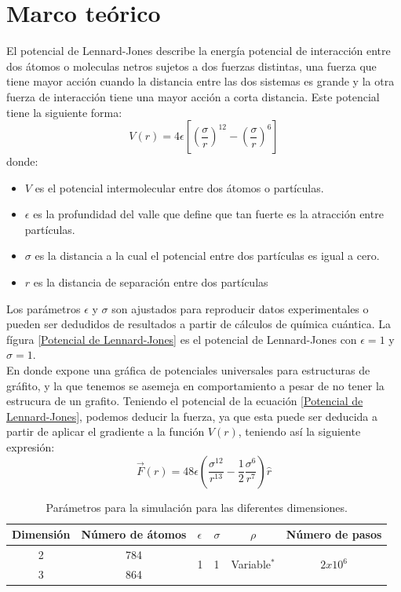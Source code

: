 \documentclass[reprint,amsmath,amssymb,aps,]{revtex4-2}
\begin{document}
\section{Marco teórico}
El potencial de Lennard-Jones describe la energía potencial de interacción entre dos átomos o moleculas netros sujetos a dos fuerzas distintas, una fuerza que tiene mayor acción cuando la distancia entre las dos sistemas es grande y la otra fuerza de interacción tiene una mayor acción a corta distancia. Este potencial tiene la siguiente forma:
\begin{equation}
    \label{Potencial de Lennard-Jones}
    V(r) = 4 \epsilon \left[\left(\frac{\sigma}{r} \right)^{12} - \left(\frac{\sigma}{r} \right)^6 \right]
\end{equation}
donde:
\begin{itemize}
    \item $V$ es el potencial intermolecular entre dos átomos o partículas.
    \item $\epsilon$ es la profundidad del valle que define que tan fuerte es la atracción entre partículas.
    \item $\sigma$ es la distancia a la cual el potencial entre dos partículas es igual a cero.
    \item $r$ es la distancia de separación entre dos partículas
\end{itemize}
Los parámetros $\epsilon$ y $\sigma$ son ajustados para reproducir datos experimentales o pueden ser dedudidos de resultados a partir de cálculos de química cuántica. La fígura \ref{Potencial de Lennard-Jones} es el potencial de Lennard-Jones con $\epsilon=1$ y $\sigma=1$.\\
En donde expone una gráfica de potenciales universales para estructuras de gráfito, y la que tenemos se asemeja en comportamiento a pesar de no tener la estrucura de un grafito.
Teniendo el potencial de la ecuación \ref{Potencial de Lennard-Jones}, podemos deducir la fuerza, ya que esta puede ser deducida a partir de aplicar el gradiente a la función $V(r)$, teniendo así la siguiente expresión:
\begin{equation}
    \label{eq:fuerzateo}
    \vec{F}(r)= 48\epsilon \left(\frac{\sigma^{12}}{r^{13}}- \frac{1}{2}\frac{\sigma^6}{r^7} \right) \hat{r}
\end{equation}\begin{table}
    \centering
    \begin{tabular}{ccp{1cm}p{0.5cm}cc}
        \hline
        Dimensión & Número de átomos & $\epsilon$ & $\sigma $ & $\rho $ & Número de pasos \\ \hline
        2 &784 &\multirow{2}{*}{1} &\multirow{2}{*}{1}  &\multirow{2}{*}{Variable$^{*}$}  &\multirow{2}{*}{$2x10^{6}$}  \\
        3 &864 & & & & \\ \hline
    \end{tabular}
    \caption{Parámetros para la simulación para las diferentes dimensiones.}
    \label{table:parametros}
\end{table}
\end{document}
